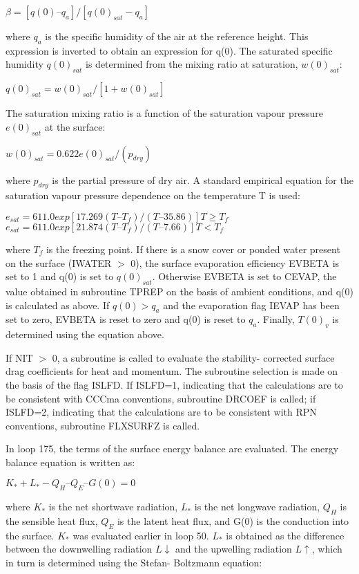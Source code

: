 $\beta = [q(0) – q_a]/[q(0)_{sat} - q_a]$

where $q_a$ is the specific humidity of the air at the reference height. This expression is inverted to obtain an expression for q(0). The saturated specific humidity $q(0)_{sat}$ is determined from the mixing ratio at saturation, $w(0)_{sat}$\+:

$q(0)_{sat} = w(0)_{sat}/[1 + w(0)_{sat}]$

The saturation mixing ratio is a function of the saturation vapour pressure $e(0)_{sat}$ at the surface\+:

$w(0)_{sat} = 0.622 e(0)_{sat}/(p_{dry})$

where $p_{dry}$ is the partial pressure of dry air. A standard empirical equation for the saturation vapour pressure dependence on the temperature T is used\+:

$e_{sat} = 611.0 exp[17.269 (T – T_f)/(T – 35.86)] T \geq T_f$ $e_{sat} = 611.0 exp[21.874 (T – T_f)/(T – 7.66)] T < T_f$

where $T_f$ is the freezing point. If there is a snow cover or ponded water present on the surface (I\+W\+A\+T\+E\+R $>$ 0), the surface evaporation efficiency E\+V\+B\+E\+T\+A is set to 1 and q(0) is set to $q(0)_{sat}$. Otherwise E\+V\+B\+E\+T\+A is set to C\+E\+V\+A\+P, the value obtained in subroutine T\+P\+R\+E\+P on the basis of ambient conditions, and q(0) is calculated as above. If $q(0) > q_a$ and the evaporation flag I\+E\+V\+A\+P has been set to zero, E\+V\+B\+E\+T\+A is reset to zero and q(0) is reset to $q_a$. Finally, $T(0)_v$ is determined using the equation above.

If N\+I\+T $>$ 0, a subroutine is called to evaluate the stability-\/ corrected surface drag coefficients for heat and momentum. The subroutine selection is made on the basis of the flag I\+S\+L\+F\+D. If I\+S\+L\+F\+D=1, indicating that the calculations are to be consistent with C\+C\+Cma conventions, subroutine D\+R\+C\+O\+E\+F is called; if I\+S\+L\+F\+D=2, indicating that the calculations are to be consistent with R\+P\+N conventions, subroutine F\+L\+X\+S\+U\+R\+F\+Z is called.

In loop 175, the terms of the surface energy balance are evaluated. The energy balance equation is written as\+:

$K_* + L_* - Q_H – Q_E – G(0) = 0$

where $K_*$ is the net shortwave radiation, $L_*$ is the net longwave radiation, $Q_H$ is the sensible heat flux, $Q_E$ is the latent heat flux, and G(0) is the conduction into the surface. $K_*$ was evaluated earlier in loop 50. $L_*$ is obtained as the difference between the downwelling radiation $L \downarrow$ and the upwelling radiation $L \uparrow$, which in turn is determined using the Stefan-\/ Boltzmann equation\+:

